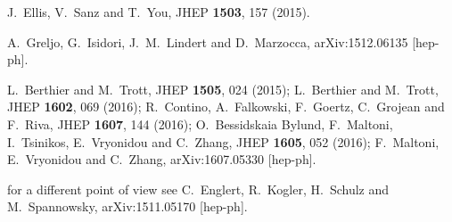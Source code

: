   J.~Ellis, V.~Sanz and T.~You,
  JHEP {\bf 1503}, 157 (2015).

  A.~Greljo, G.~Isidori, J.~M.~Lindert and D.~Marzocca,
  arXiv:1512.06135 [hep-ph].

  L.~Berthier and M.~Trott,
  JHEP {\bf 1505}, 024 (2015);
  L.~Berthier and M.~Trott,
  JHEP {\bf 1602}, 069 (2016);
  R.~Contino, A.~Falkowski, F.~Goertz, C.~Grojean and F.~Riva,
  JHEP {\bf 1607}, 144 (2016);
  O.~Bessidskaia Bylund, F.~Maltoni, I.~Tsinikos, E.~Vryonidou and C.~Zhang,
  JHEP {\bf 1605}, 052 (2016);
  F.~Maltoni, E.~Vryonidou and C.~Zhang,
  arXiv:1607.05330 [hep-ph].

  for a different point of view see \eg 
  C.~Englert, R.~Kogler, H.~Schulz and M.~Spannowsky,
  arXiv:1511.05170 [hep-ph].

